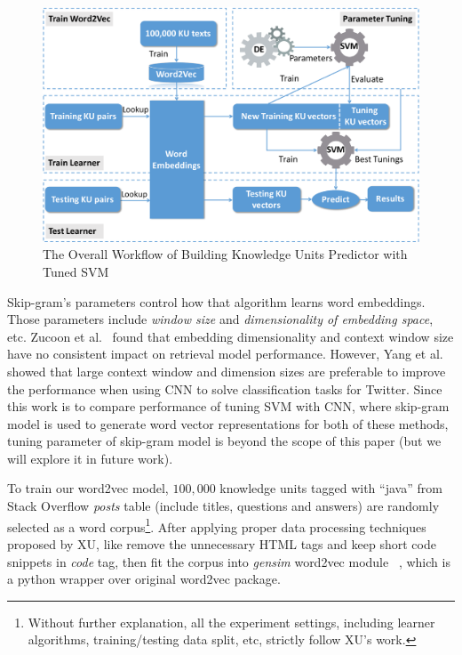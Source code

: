 \documentclass[sigconf]{acmart}
\theoremstyle{break}
\begin{document}
 \begin{figure}
    \centering
     \includegraphics[width=\textwidth]{pic/workflow.pdf} %
    \caption{The Overall Workflow of Building Knowledge Units Predictor with Tuned SVM}
    \label{fig:workflow}
\end{figure}




Skip-gram's parameters control how that algorithm
  learns   word embeddings. Those parameters include
  {\it window size} and {\it dimensionality of embedding space}, etc. 
Zucoon et al.~\cite{zuccon2015integrating} found that embedding dimensionality
and context window size have no consistent impact on retrieval model performance. However,
Yang et al.~\cite{yang2016using} showed that large context window and dimension
 sizes are preferable to improve the performance when using CNN to solve  classification tasks
 for Twitter. Since this work is to compare performance of  tuning SVM  with CNN, where
 skip-gram model is used to generate word vector representations for both of these methods, 
 tuning parameter of skip-gram model is beyond the scope of this paper 
 (but we will explore it in future work).
 
 

To train our word2vec model, $100,000$ knowledge units tagged with ``java'' from
Stack Overflow {\it posts} table  (include titles, questions and answers)
are randomly selected as a word corpus\footnote{Without further explanation, 
all the experiment settings, including learner algorithms,
training/testing data split, etc, strictly follow XU's work. }. 
After applying proper data processing techniques proposed by XU, like
 remove the unnecessary HTML tags and keep short code snippets in
{\it code} tag, then fit the corpus into {\it gensim} word2vec module ~\cite{rehurek2010software},
which is a python wrapper over original word2vec package.
\end{document}
